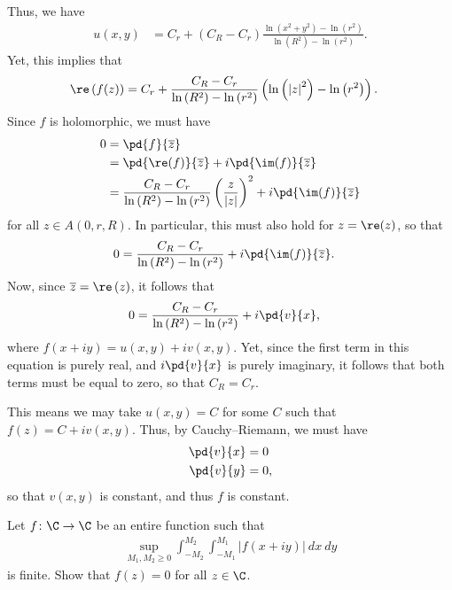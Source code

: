 \documentclass[10pt]{mypackage}
\begin{document}
\begin{solution}
  Thus, we have
  \begin{align*}
    u\left( x,y \right) &= C_r + \left( C_R - C_r \right)\frac{\ln\left( x^2 + y^2 \right) - \ln\left( r^2 \right)}{\ln\left( R^2 \right) - \ln\left( r^2 \right)}.
  \end{align*}
  Yet, this implies that
  \begin{align*}
    \re\left( f(z) \right) &= C_r + \frac{C_R - C_r}{\ln\left( R^2 \right) - \ln\left( r^2 \right)} \left( \ln\left( \left\vert z \right\vert^2 \right) - \ln\left( r^2 \right) \right).
  \end{align*}
  Since $f$ is holomorphic, we must have
  \begin{align*}
    0 &= \pd{f}{ \overline{z} }\\
      &= \pd{\re(f)}{ \overline{z} } + i \pd{ \im(f) }{ \overline{z} }\\
      &= \frac{C_R - C_r}{ \ln\left( R^2 \right) - \ln\left( r^2 \right) } \left( \frac{z}{\left\vert z \right\vert} \right)^2 + i \pd{\im(f)}{ \overline{z} }
  \end{align*}
  for all $z\in A\left( 0,r,R \right)$. In particular, this must also hold for $ z = \re(z) $, so that
  \begin{align*}
    0 &= \frac{C_R - C_r}{\ln\left( R^2 \right) - \ln\left( r^2 \right)} + i \pd{\im(f)}{ \overline{z} }.
  \end{align*}
  Now, since $ \overline{z} = \re\left( z \right) $, it follows that
  \begin{align*}
    0 &= \frac{C_R - C_r}{\ln\left( R^2 \right) - \ln\left( r^2 \right)} + i \pd{v}{ x },
  \end{align*}
  where $ f\left( x + iy \right) = u\left( x,y \right) + i v\left( x,y \right) $. Yet, since the first term in this equation is purely real, and $ i \pd{v}{x} $ is purely imaginary, it follows that both terms must be equal to zero, so that $C_R = C_r$.\newline

  This means we may take $u\left( x,y \right) = C$ for some $C$ such that $f(z) = C + i v\left( x,y \right)$. Thus, by Cauchy--Riemann, we must have
  \begin{align*}
    \pd{v}{x} &= 0\\
    \pd{v}{y} &= 0,
  \end{align*}
  so that $v\left( x,y \right)$ is constant, and thus $f$ is constant.
\end{solution}
\begin{problem}[Problem 3]
  Let $f\colon \C\rightarrow \C$ be an entire function such that
  \begin{align*}
    \sup_{M_1,M_2 \geq 0} \int_{-M_2}^{M_2} \int_{-M_1}^{M_1} \left\vert f\left( x + iy \right) \right\vert\:dx\:dy
  \end{align*}
  is finite. Show that $f(z) = 0$ for all $z\in \C$.
\end{problem}
\end{document}
